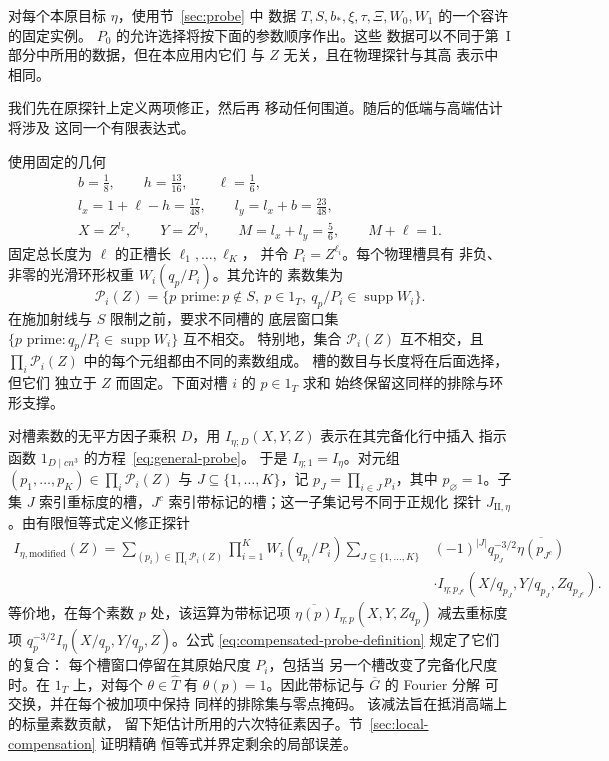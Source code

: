 对每个本原目标 $\eta$，使用节~\ref{sec:probe} 中
数据 $T,S,b_*,\xi,\tau,\Xi,W_0,W_1$ 的一个容许的固定实例。
$P_0$ 的允许选择将按下面的参数顺序作出。这些
数据可以不同于第~I 部分中所用的数据，但在本应用内它们
与 $Z$ 无关，且在物理探针与其高
表示中相同。

我们先在原探针上定义两项修正，然后再
移动任何围道。随后的低端与高端估计将涉及
这同一个有限表达式。

使用固定的几何
\begin{equation}
 \begin{gathered}
 b=\frac18,\qquad h=\frac{13}{16},\qquad \ell=\frac16,\\
 l_x=1+\ell-h=\frac{17}{48},\qquad
 l_y=l_x+b=\frac{23}{48},\\
 X=Z^{l_x},\qquad Y=Z^{l_y},\qquad
 M=l_x+l_y=\frac56,\qquad M+\ell=1.
 \end{gathered}
 \label{old-eq:5.1}
\end{equation}
固定总长度为 $\ell$ 的正槽长 $\ell_1,\ldots,\ell_K$，
并令 $P_i=Z^{\ell_i}$。每个物理槽具有
非负、非零的光滑环形权重 $W_i(q_p/P_i)$。其允许的
素数集为
\[
 \mathcal P_i(Z)=\{p\text{ prime}:p\notin S,\ p\in1_T,
                         \ q_p/P_i\in\operatorname{supp}W_i\}.
\]
在施加射线与 $S$ 限制之前，要求不同槽的
底层窗口集
$\{p\text{ prime}:q_p/P_i\in\operatorname{supp}W_i\}$
互不相交。
特别地，集合 $\mathcal P_i(Z)$ 互不相交，且
$\prod_i\mathcal P_i(Z)$ 中的每个元组都由不同的素数组成。
槽的数目与长度将在后面选择，但它们
独立于 $Z$ 而固定。下面对槽 $i$ 的 $p\in1_T$ 求和
始终保留这同样的排除与环形支撑。

对槽素数的无平方因子乘积 $D$，用
$I_{\eta;D}(X,Y,Z)$ 表示在其完备化行中插入
指示函数 $1_{D\mid cn^3}$ 的方程~\eqref{eq:general-probe}。
于是 $I_{\eta;1}=I_\eta$。对元组
$(p_1,\ldots,p_K)\in\prod_i\mathcal P_i(Z)$ 与
$J\subseteq\{1,\ldots,K\}$，记 $p_J=\prod_{i\in J}p_i$，其中
$p_\varnothing=1$。子集 $J$ 索引重标度的槽，$J^c$
索引带标记的槽；这一子集记号不同于正规化
探针 $J_{\mathrm{II},\eta}$。由有限恒等式定义修正探针
\begin{equation}\label{eq:compensated-probe-definition}
\begin{split}
 I_{\eta,\mathrm{modified}}(Z)
 =\sum_{(p_i)\in\prod_i\mathcal P_i(Z)}\prod_{i=1}^K W_i(q_{p_i}/P_i)
 \sum_{J\subseteq\{1,\ldots,K\}}&(-1)^{|J|}q_{p_J}^{-3/2}
          \overline{\eta(p_{J^c})}\\
 &\cdot I_{\eta;p_{J^c}}
       (X/q_{p_J},Y/q_{p_J},Zq_{p_{J^c}}).
\end{split}
\end{equation}
等价地，在每个素数 $p$ 处，该运算为带标记项
$\overline{\eta(p)}I_{\eta;p}(X,Y,Zq_p)$ 减去重标度项
$q_p^{-3/2}I_\eta(X/q_p,Y/q_p,Z)$。公式
\eqref{eq:compensated-probe-definition} 规定了它们的复合：
每个槽窗口停留在其原始尺度 $P_i$，包括当
另一个槽改变了完备化尺度时。在 $1_T$ 上，对每个
$\theta\in\widehat T$ 有 $\theta(p)=1$。因此带标记与 $\overline G$ 的 Fourier 分解
可交换，并在每个被加项中保持
同样的排除集与零点掩码。
该减法旨在抵消高端上的标量素数贡献，
留下矩估计所用的六次特征素因子。节~\ref{sec:local-compensation} 证明精确
恒等式并界定剩余的局部误差。

